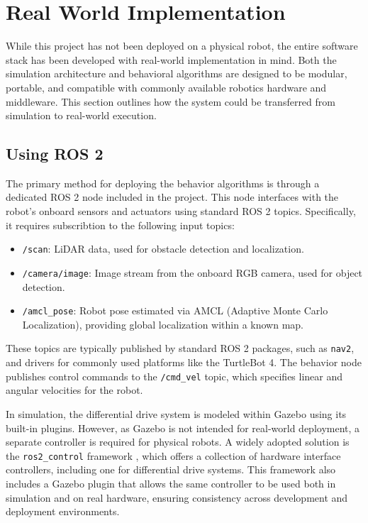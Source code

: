 \section{Real World Implementation}
While this project has not been deployed on a physical robot, the entire software stack has been developed with real-world implementation in mind. 
Both the simulation architecture and behavioral algorithms are designed to be modular, portable, and compatible with commonly available robotics hardware and middleware. 
This section outlines how the system could be transferred from simulation to real-world execution.

\subsection{Using ROS 2}
The primary method for deploying the behavior algorithms is through a dedicated ROS 2 node included in the project. 
This node interfaces with the robot’s onboard sensors and actuators using standard ROS 2 topics. 
Specifically, it requires subscribtion to the following input topics:

\begin{itemize}
  \item \texttt{/scan}: LiDAR data, used for obstacle detection and localization.
  \item \texttt{/camera/image}: Image stream from the onboard RGB camera, used for object detection.
  \item \texttt{/amcl\_pose}: Robot pose estimated via AMCL (Adaptive Monte Carlo Localization), providing global localization within a known map.
\end{itemize}

These topics are typically published by standard ROS 2 packages, such as \texttt{nav2}, and drivers for commonly used platforms like the TurtleBot 4. 
The behavior node publishes control commands to the \texttt{/cmd\_vel} topic, which specifies linear and angular velocities for the robot.

In simulation, the differential drive system is modeled within Gazebo using its built-in plugins. 
However, as Gazebo is not intended for real-world deployment, a separate controller is required for physical robots. 
A widely adopted solution is the \texttt{ros2\_control} framework \cite{ros2_control}, which offers a collection of hardware interface controllers, including one for differential drive systems.
This framework also includes a Gazebo plugin that allows the same controller to be used both in simulation and on real hardware, ensuring consistency across development and deployment environments.

